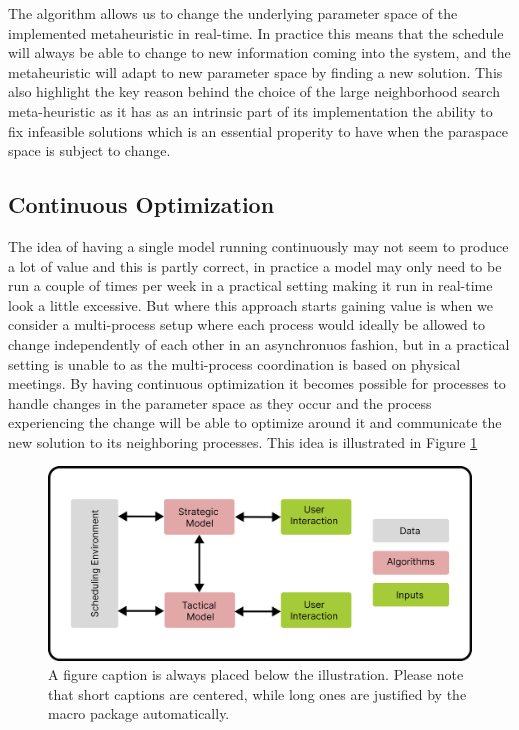 \documentclass[runningheads]{llncs}
\begin{document}
The algorithm allows us to change the underlying parameter space of the implemented metaheuristic
in real-time. In practice this means that the schedule will always be able to change to new information
coming into the system, and the metaheuristic will adapt to new parameter space by finding a new solution. 
This also highlight the key reason behind the choice of the large neighborhood search meta-heuristic as it
has as an intrinsic part of its implementation the ability to fix infeasible solutions which is an essential
properity to have when the paraspace space is subject to change. 

\subsection{Continuous Optimization}
The idea of having a single model running continuously may not seem to produce a lot of 
value and this is partly correct, in practice a model may only need to be 
run a couple of times per week in a practical setting making it run in real-time 
look a little excessive. But where this approach starts gaining value is when we 
consider a multi-process setup where each process would ideally be allowed to change
independently of each other in an asynchronuos fashion, but in a practical setting is 
unable to as the multi-process coordination is based on physical meetings. By having 
continuous optimization it becomes possible for processes to handle changes in the parameter
space as they occur and the process experiencing the change will be able to optimize around
it and communicate the new solution to its neighboring processes. This idea is illustrated 
in Figure \ref{:model-interplay} 



\begin{figure}
\includegraphics[width=\textwidth]{figures/patat-small-architecture-example.png}
\caption{A figure caption is always placed below the illustration.
Please note that short captions are centered, while long ones are
justified by the macro package automatically.} \label{:model-interplay}
\end{figure}
\end{document}
